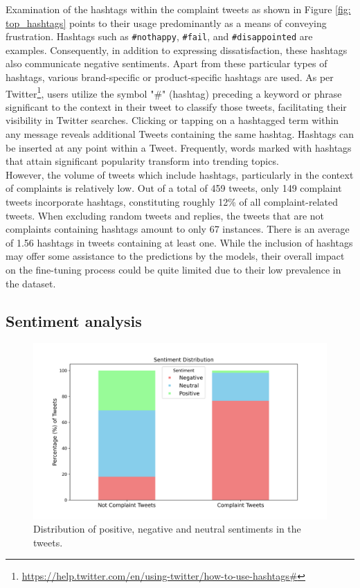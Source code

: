 Examination of the hashtags within the complaint tweets as shown in Figure \ref{fig: top_hashtags} points to their usage predominantly as a means of conveying frustration. Hashtags such as \texttt{\#nothappy}, \texttt{\#fail}, and \texttt{\#disappointed} are examples. Consequently, in addition to expressing dissatisfaction, these hashtags also communicate negative sentiments. Apart from these particular types of hashtags, various brand-specific or product-specific hashtags are used. As per Twitter\footnote{\url{https://help.twitter.com/en/using-twitter/how-to-use-hashtags#}}, users utilize the symbol "\#" (hashtag) preceding a keyword or phrase significant to the context in their tweet to classify those tweets, facilitating their visibility in Twitter searches. Clicking or tapping on a hashtagged term within any message reveals additional Tweets containing the same hashtag. Hashtags can be inserted at any point within a Tweet. Frequently, words marked with hashtags that attain significant popularity transform into trending topics. \\

However, the volume of tweets which include hashtags, particularly in the context of complaints is relatively low. Out of a total of 459 tweets, only 149 complaint tweets incorporate hashtags, constituting roughly 12\% of all complaint-related tweets. When excluding random tweets and replies, the tweets that are not complaints containing hashtags amount to only 67 instances. There is an average of 1.56 hashtags in tweets containing at least one. While the inclusion of hashtags may offer some assistance to the predictions by the models, their overall impact on the fine-tuning process could be quite limited due to their low prevalence in the dataset.\\

\subsection{Sentiment analysis}
\begin{figure}[htb]
    \centering
    \includegraphics[width=12cm]{figures/sentiment.png}
    \vspace*{-3mm}
    \caption{Distribution of positive, negative and neutral sentiments in the tweets.}
    \label{fig: sentiment}
\end{figure}

